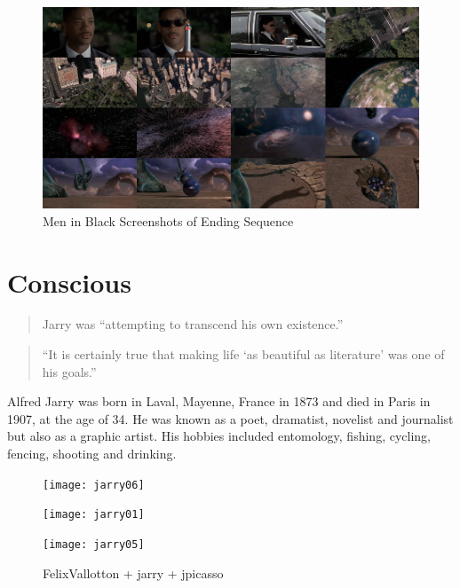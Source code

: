 \begin{figure}[htb] %
  \centering
  \includegraphics[width=\linewidth]{images/mib}
  \caption[Men in Black]{Men in Black Screenshots of Ending Sequence}
\label{fig:MIB}
\end{figure}

\section{Conscious}

\begin{quote}
  Jarry was ``attempting to transcend his own existence.'' \autocite{Hugill2012}
\end{quote}

\begin{quote}
  ``It is certainly true that making life `as beautiful as literature' was one of his goals.'' \autocite{Hugill2012}
\end{quote}

Alfred Jarry was born in Laval, Mayenne, France in 1873 and died in Paris in 1907, at the age of 34. He was known as a poet, dramatist, novelist and journalist but also as a graphic artist. His hobbies included entomology, fishing, cycling, fencing, shooting and drinking.

\begin{figure}[htb]
  \centering
  \begin{minipage}{.275\linewidth}
    \texttt{[image: jarry06]}
  \end{minipage}
  \hspace{.05\linewidth}
  \begin{minipage}{.275\linewidth}
    \texttt{[image: jarry01]}
  \end{minipage}
  \hspace{.05\linewidth}
  \begin{minipage}{.275\linewidth}
    \texttt{[image: jarry05]}
  \end{minipage}
  \caption[figures1--3]{FelixVallotton + jarry + jpicasso}
\label{img123}
\end{figure}

